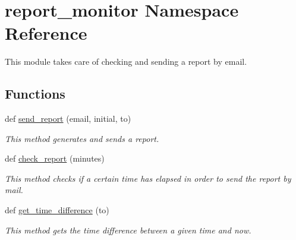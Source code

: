 \hypertarget{namespacereport__monitor}{}\section{report\+\_\+monitor Namespace Reference}
\label{namespacereport__monitor}


This module takes care of checking and sending a report by email.  


\subsection*{Functions}
\begin{DoxyCompactItemize}
\item 
def \hyperlink{namespacereport__monitor_a0319e267658eed6a0af3008734a31423}{send\+\_\+report} (email, initial, to)
\begin{DoxyCompactList}\small\item\em This method generates and sends a report. \end{DoxyCompactList}\item 
def \hyperlink{namespacereport__monitor_ac48ed477bccc0f581f78aaed34ff934a}{check\+\_\+report} (minutes)
\begin{DoxyCompactList}\small\item\em This method checks if a certain time has elapsed in order to send the report by mail. \end{DoxyCompactList}\item 
def \hyperlink{namespacereport__monitor_aba839cc4a115d3c05481ad49d367f567}{get\+\_\+time\+\_\+difference} (to)
\begin{DoxyCompactList}\small\item\em This method gets the time difference between a given time and now. \end{DoxyCompactList}\end{DoxyCompactItemize}
